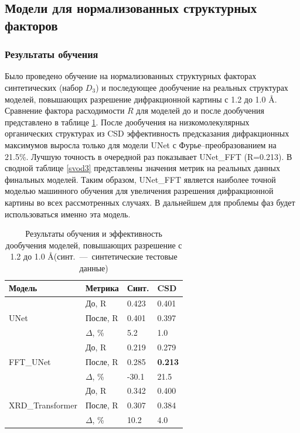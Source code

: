 \subsection{Модели для нормализованных структурных факторов}

\subsubsection{Результаты обучения}

Было проведено обучение на нормализованных структурных факторах синтетических (набор $D_3$) и последующее дообучение на реальных структурах моделей, повышающих разрешение дифракционной картины с 1.2 до 1.0 \AA. Сравнение фактора расходимости $R$ для моделей до и после дообучения представлено в таблице \ref{doposle3}. После дообучения на низкомолекулярных органических структурах из CSD эффективность предсказания дифракционных максимумов выросла только для модели UNet с Фурье--преобразованием на 21.5\%. Лучшую точность в очередной раз показывает UNet\_FFT (R=0.213). В сводной таблице \ref{svod3} представлены значения метрик на реальных данных финальных моделей. Таким образом, UNet\_FFT является наиболее точной моделью машинного обучения для увеличения разрешения дифракционной картины во всех рассмотренных случаях. В дальнейшем для проблемы фаз будет использоваться именно эта модель.

\begin{table}[H]
	\caption{Результаты обучения и эффективность дообучения моделей, повышающих разрешение с 1.2 до 1.0 \AA (синт.~---~синтетические тестовые данные)}
	\label{doposle3}
	\centering
	\footnotesize
	\begin{tabular}{|l|l|l|l|} 
		\hline
		\textbf{Модель} & \textbf{Метрика} & \textbf{Синт.} & \textbf{CSD}  \\ 
		\hline
		\multirow{3}{*}{UNet} 
		& До, R & 0.423 & 0.401 \\ 
		& После, R  & 0.401 & 0.397 \\ 
		& $\Delta$, \%       & 5.2 & 1.0  \\
		\hline
		\multirow{3}{*}{FFT\_UNet}
		& До, R & 0.219 & 0.279 \\ 
		& После, R  & 0.285 & \textbf{0.213} \\ 
		& $\Delta$, \%       & -30.1  & 21.5  \\
		\hline
		\multirow{3}{*}{XRD\_Transformer}
		& До, R & 0.342 & 0.400 \\ 
		& После, R  & 0.307 & 0.384 \\ 
		& $\Delta$, \%       & 10.2 & 4.0  \\
		\hline
	\end{tabular}
\end{table}



